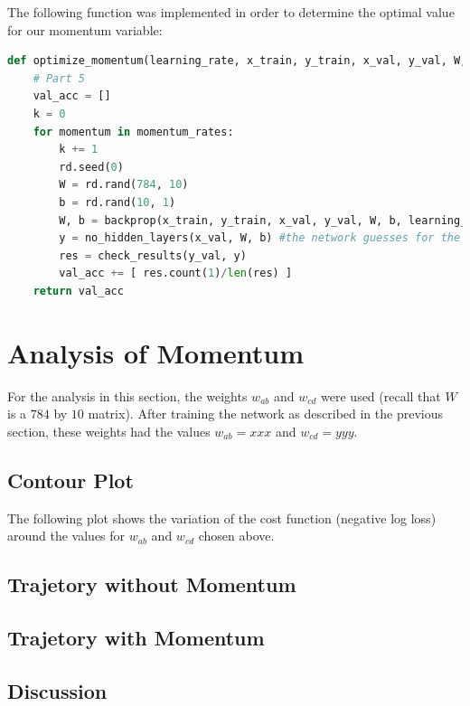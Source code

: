 \documentclass{article}
\begin{document}
 The following function was implemented in order to determine the optimal value for our momentum variable:
 \begin{lstlisting}[language=Python]
  	def optimize_momentum(learning_rate, x_train, y_train, x_val, y_val, W, b, max_iter, momentum_rates):
    # Part 5
    val_acc = []
    k = 0
    for momentum in momentum_rates:
        k += 1
        rd.seed(0)  
        W = rd.rand(784, 10)
        b = rd.rand(10, 1)
        W, b = backprop(x_train, y_train, x_val, y_val, W, b, learning_rate, max_iter, momentum, filename='part5_optimize_momentum'+str(k)+'.jpg' )
        y = no_hidden_layers(x_val, W, b) #the network guesses for the validation set
        res = check_results(y_val, y)
        val_acc += [ res.count(1)/len(res) ]
    return val_acc
\end{lstlisting}

   \section{Analysis of Momentum}
   For the analysis in this section, the weights $w_{ab}$ and $w_{cd}$ were used (recall that $W$ is
   a $784$ by $10$ matrix). After training the network as described in the previous section,
   these weights had the values $w_{ab} = xxx$ and $w_{cd} = yyy$.

   \subsection{Contour Plot}
   The following plot shows the variation of the cost function (negative log loss) around the
   values for $w_{ab}$ and $w_{cd}$ chosen above.

   \subsection{Trajetory without Momentum}

   \subsection{Trajetory with Momentum}

   \subsection{Discussion}
\end{document}
